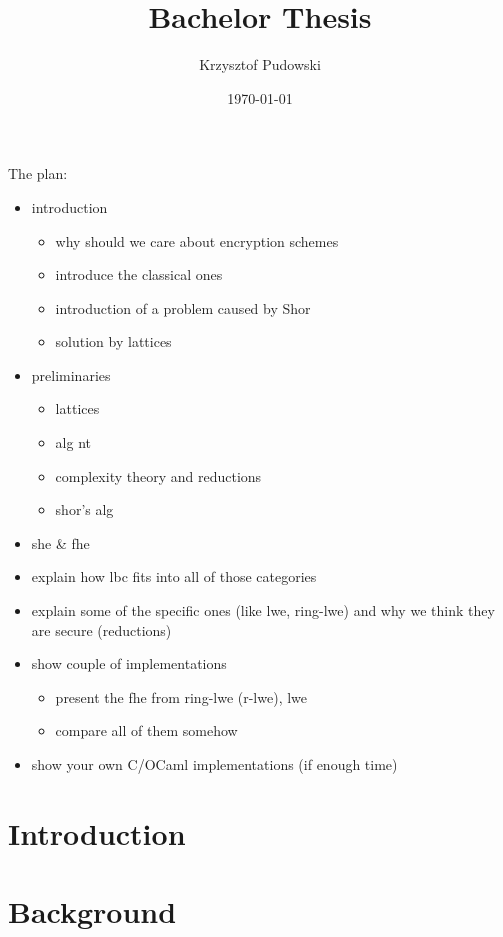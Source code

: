 \documentclass[11pt,a4paper]{article}
\title{Bachelor Thesis}
\author{Krzysztof Pudowski}
\date{\today}
\theoremstyle{plain}
\theoremstyle{definition}
\theoremstyle{remark}
\begin{document}



\tableofcontents

The plan:
\begin{itemize}
    \item introduction
    \begin{itemize}
        \item why should we care about encryption schemes
        \item introduce the classical ones
        \item introduction of a problem caused by Shor
        \item solution by lattices
    \end{itemize}
    \item preliminaries
    \begin{itemize}
        \item lattices
        \item alg nt
        \item complexity theory and reductions
        \item shor's alg
    \end{itemize}
    \item she \& fhe
    \item explain how lbc fits into all of those categories
    \item explain some of the specific ones (like lwe, ring-lwe) and why we think they are secure (reductions)
    \item show couple of implementations
    \begin{itemize}
        \item present the fhe from ring-lwe (r-lwe), lwe
        \item compare all of them somehow
    \end{itemize}

    \item show your own C/OCaml implementations (if enough time)
\end{itemize}

\section{Introduction}


\section{Background}

\end{document}
